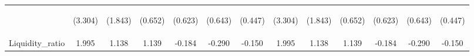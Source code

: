 \documentclass[]{article}
\begin{document}
\begin{center}
\begin{tabular}{lcccccccccccc}
\vspace{4pt} & \begin{footnotesize}(3.304)\end{footnotesize} & \begin{footnotesize}(1.843)\end{footnotesize} & \begin{footnotesize}(0.652)\end{footnotesize} & \begin{footnotesize}(0.623)\end{footnotesize} & \begin{footnotesize}(0.643)\end{footnotesize} & \begin{footnotesize}(0.447)\end{footnotesize} & \begin{footnotesize}(3.304)\end{footnotesize} & \begin{footnotesize}(1.843)\end{footnotesize} & \begin{footnotesize}(0.652)\end{footnotesize} & \begin{footnotesize}(0.623)\end{footnotesize} & \begin{footnotesize}(0.643)\end{footnotesize} & \begin{footnotesize}(0.447)\end{footnotesize} \\
Liquidity\_ratio & 1.995 & 1.138 & 1.139 & -0.184 & -0.290 & -0.150 & 1.995 & 1.138 & 1.139 & -0.184 & -0.290 & -0.150 \\

\end{tabular}
\end{center}
\end{document}
